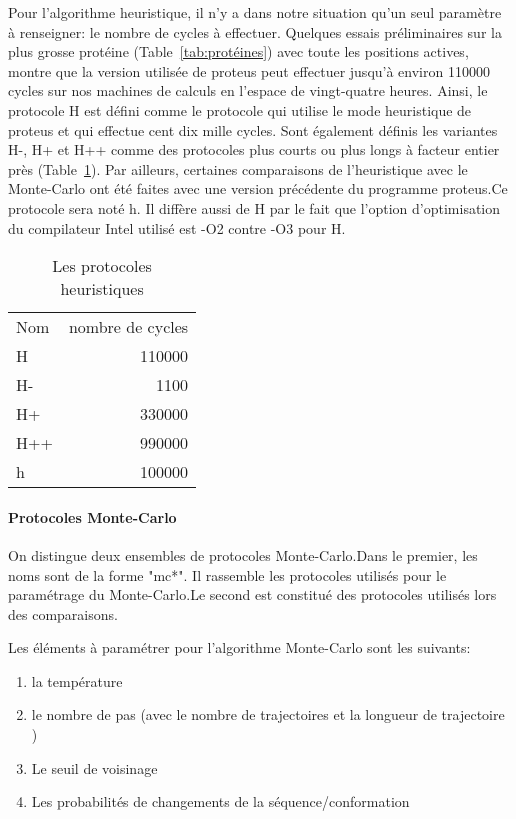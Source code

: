 Pour l'algorithme heuristique, il n'y a dans notre situation qu'un seul paramètre à renseigner: le nombre de cycles à effectuer. Quelques essais préliminaires sur la plus grosse protéine (Table~\ref{tab:protéines}) avec toute les positions actives, montre que la version utilisée de proteus peut effectuer jusqu'à environ 110000 cycles sur nos machines de calculs en l'espace de vingt-quatre heures. Ainsi, le protocole H est défini comme le protocole qui utilise le mode heuristique de proteus et qui effectue cent dix mille cycles. Sont également définis les variantes H-, H+ et H++ comme des protocoles plus courts ou plus longs à facteur entier près (Table~\ref{tab:protoH}). Par ailleurs, certaines comparaisons de l'heuristique avec le Monte-Carlo ont été faites avec une version précédente du programme proteus.Ce protocole sera noté h. Il diffère aussi de H par le fait que l'option d'optimisation du compilateur Intel utilisé est -O2 contre -O3 pour H.    


    \begin{table}[!htbp]
      \centering

      \begin{tabular}{lr}

        \toprule
        Nom & nombre de cycles \\
        \cmidrule{1-2}
        H   & 110000 \\  
        H-  & 1100   \\  
        H+  & 330000 \\  
        H++ & 990000 \\  
        h   & 100000 \\  
        \bottomrule

      \end{tabular}      
      \caption{Les protocoles heuristiques}
\label{tab:protoH}      
    \end{table}

   \paragraph{Protocoles Monte-Carlo}
\label{para:MC}
On distingue deux ensembles de protocoles Monte-Carlo.Dans le premier, les noms  sont de la forme "mc*". Il rassemble les protocoles utilisés pour le paramétrage du Monte-Carlo.Le second est constitué des protocoles utilisés lors des comparaisons.     

Les éléments à paramétrer pour l'algorithme Monte-Carlo sont les suivants:

\begin{enumerate}
\item la température
\item le nombre de pas (avec le nombre de trajectoires et la longueur de trajectoire )
\item Le seuil de voisinage
\item Les probabilités de changements de la séquence/conformation
\end{enumerate}

